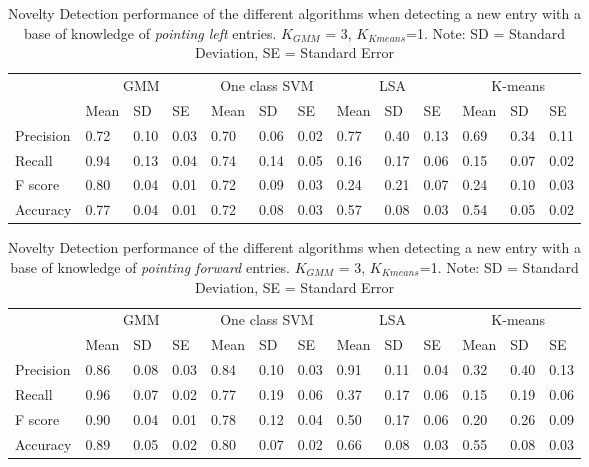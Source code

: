 \begin{table}[!ht]
	\footnotesize
	\renewcommand{\arraystretch}{2}
	\begin{tabular}{p{1.2cm}p{0.7cm}p{0.6cm}p{0.7cm}p{0.7cm}p{0.6cm}p{0.7cm}p{0.7cm}p{0.6cm}p{0.7cm}p{0.7cm}p{0.6cm}p{0.7cm}}
	\hline
	 & \multicolumn{3}{c}{GMM}& \multicolumn{3}{c}{One class SVM}& \multicolumn{3}{c}{LSA}& \multicolumn{3}{c}{K-means} \\
	 & Mean    & SD & SE& Mean    & SD & SE& Mean    & SD & SE& Mean    & SD & SE \\
	\hline
	Precision  & 0.72 & 0.10 & 0.03 & 0.70 & 0.06 & 0.02 & 0.77 & 0.40 & 0.13 & 0.69 & 0.34 & 0.11      \\
	Recall  & 0.94 & 0.13 & 0.04 & 0.74 & 0.14 & 0.05 & 0.16 & 0.17 & 0.06 & 0.15 & 0.07 & 0.02    \\
	F score  & 0.80 & 0.04 & 0.01 & 0.72 & 0.09 & 0.03 & 0.24 & 0.21 & 0.07 & 0.24 & 0.10 & 0.03    \\
	Accuracy   & 0.77 & 0.04 & 0.01 & 0.72 & 0.08 & 0.03 & 0.57 & 0.08 & 0.03 & 0.54 & 0.05 & 0.02   \\
	\hline
	\end{tabular}
	\centering
	\caption[Novelty Detection perfomance for \emph{pointing left} entries]{Novelty Detection performance of the different algorithms when detecting a new entry with a base of knowledge of \emph{pointing left} entries. $ K_{GMM} $ = 3, $ K_{Kmeans} $=1. Note: SD = Standard Deviation, SE = Standard Error  }
\end{table}


\begin{table}[!ht]
	\footnotesize
	\renewcommand{\arraystretch}{2}
	\begin{tabular}{p{1.2cm}p{0.7cm}p{0.6cm}p{0.7cm}p{0.7cm}p{0.6cm}p{0.7cm}p{0.7cm}p{0.6cm}p{0.7cm}p{0.7cm}p{0.6cm}p{0.7cm}}
	\hline
	 & \multicolumn{3}{c}{GMM}& \multicolumn{3}{c}{One class SVM}& \multicolumn{3}{c}{LSA}& \multicolumn{3}{c}{K-means} \\
	 & Mean    & SD & SE& Mean    & SD & SE& Mean    & SD & SE& Mean    & SD & SE \\
	\hline
	Precision  & 0.86 & 0.08 & 0.03 & 0.84 & 0.10 & 0.03 & 0.91 & 0.11 & 0.04 & 0.32 & 0.40 & 0.13       \\
	Recall  &  0.96 & 0.07 & 0.02 & 0.77 & 0.19 & 0.06 & 0.37 & 0.17 & 0.06 & 0.15 & 0.19 & 0.06    \\
	F score  & 0.90 & 0.04 & 0.01 & 0.78 & 0.12 & 0.04 & 0.50 & 0.17 & 0.06 & 0.20 & 0.26 & 0.09     \\
	Accuracy   & 0.89 & 0.05 & 0.02 & 0.80 & 0.07 & 0.02 & 0.66 & 0.08 & 0.03 & 0.55 & 0.08 & 0.03   \\
	\hline
	\end{tabular}
	\centering
	\caption[Novelty Detection perfomance for \emph{pointing forward} entries]{Novelty Detection performance of the different algorithms when detecting a new entry with a base of knowledge of \emph{pointing forward} entries. $ K_{GMM} $ = 3, $ K_{Kmeans} $=1. Note: SD = Standard Deviation, SE = Standard Error  }
\end{table}

